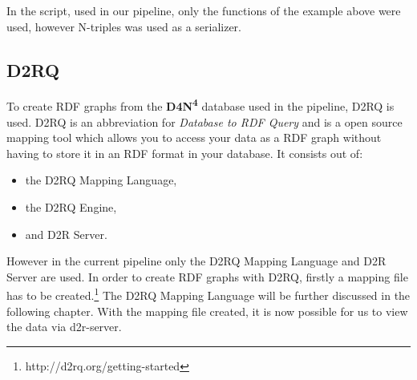 \documentclass[12pt, oneside]{article}
\begin{document}
In the script, used in our pipeline, only the functions of the example above were used, however N-triples was used as a serializer.

\newpage
\subsection{D2RQ} \label{d2r}
To create RDF graphs from the \textbf{D4N\textsuperscript{4}} database used in the pipeline, D2RQ is used.  D2RQ is an abbreviation for \textit{Database to RDF Query} and is a open source mapping tool which allows you to access your data as a RDF graph without having to store it in an RDF format in your database. It consists out of:
\begin{itemize}
	\item the D2RQ Mapping Language,
	\item the D2RQ Engine,
	\item and D2R Server.
\end{itemize}
However in the current pipeline only the D2RQ Mapping Language and D2R Server are used. In order to create RDF graphs with D2RQ, firstly a mapping file has to be created.\footnote{http://d2rq.org/getting-started} The D2RQ Mapping Language will be further discussed in the following chapter. With the mapping file created, it is now possible for us to view the data via d2r-server.
\end{document}
